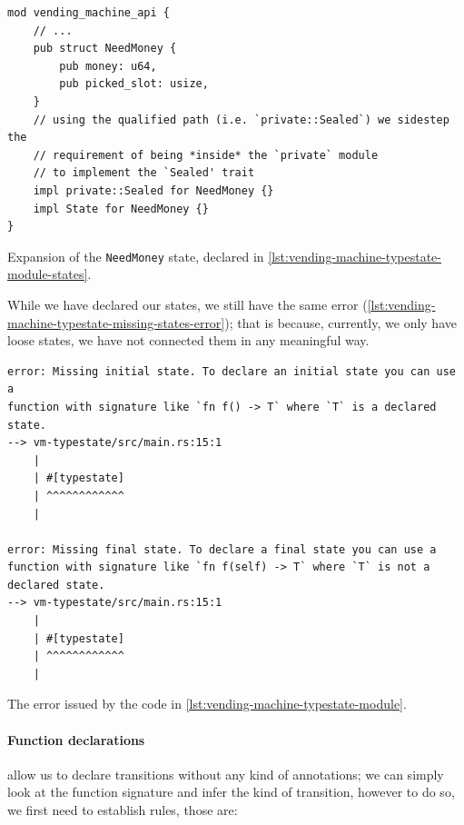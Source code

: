 \begin{listing}
    \begin{verbatim}
mod vending_machine_api {
    // ...
    pub struct NeedMoney {
        pub money: u64,
        pub picked_slot: usize,
    }
    // using the qualified path (i.e. `private::Sealed`) we sidestep the
    // requirement of being *inside* the `private` module
    // to implement the `Sealed' trait
    impl private::Sealed for NeedMoney {}
    impl State for NeedMoney {}
}
    \end{verbatim}
    \caption{Expansion of the \texttt{NeedMoney} state, declared in \autoref{lst:vending-machine-typestate-module-states}.}
    \label{lst:vending-machine-typestate-module-states-expansion}
\end{listing}

While we have declared our states, we still have the same error (\autoref{lst:vending-machine-typestate-missing-states-error});
that is because, currently, we only have loose states, we have not connected them in any meaningful way.

\begin{listing}
    \begin{verbatim}
error: Missing initial state. To declare an initial state you can use a
function with signature like `fn f() -> T` where `T` is a declared state.
--> vm-typestate/src/main.rs:15:1
    |
    | #[typestate]
    | ^^^^^^^^^^^^
    |

error: Missing final state. To declare a final state you can use a
function with signature like `fn f(self) -> T` where `T` is not a declared state.
--> vm-typestate/src/main.rs:15:1
    |
    | #[typestate]
    | ^^^^^^^^^^^^
    |
    \end{verbatim}
    \caption{The error issued by the code in \autoref{lst:vending-machine-typestate-module}.}
    \label{lst:vending-machine-typestate-missing-states-error}
\end{listing}


\paragraph{Function declarations} allow us to declare transitions without any kind of annotations;
we can simply look at the function signature and infer the kind of transition,
however to do so, we first need to establish rules, those are:

